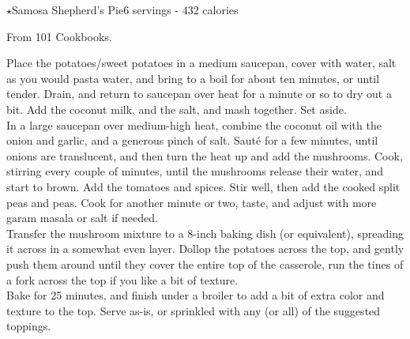 \begin{recipe}{\texorpdfstring{$\star$}{str}Samosa Shepherd's Pie}{6 servings - 432 calories}{}

\freeform From 101 Cookbooks.


Place the potatoes/sweet potatoes in a medium saucepan, cover with water, salt as you would pasta water, and bring to a boil for about ten minutes, or until tender. Drain, and return to saucepan over heat for a minute or so to dry out a bit. Add the coconut milk, and the salt, and mash together. Set aside.\\

In a large saucepan over medium-high heat, combine the coconut oil with the onion and garlic, and a generous pinch of salt. Sauté for a few minutes, until onions are translucent, and then turn the heat up and add the mushrooms. Cook, stirring every couple of minutes, until the mushrooms release their water, and start to brown. Add the tomatoes and spices. Stir well, then add the cooked split peas and peas. Cook for another minute or two, taste, and adjust with more garam masala or salt if needed.\\

Transfer the mushroom mixture to a 8-inch baking dish (or equivalent), spreading it across in a somewhat even layer. Dollop the potatoes across the top, and gently push them around until they cover the entire top of the casserole, run the tines of a fork across the top if you like a bit of texture.\\

Bake for 25 minutes, and finish under a broiler to add a bit of extra color and texture to the top. Serve as-is, or sprinkled with any (or all) of the suggested toppings.

\end{recipe}